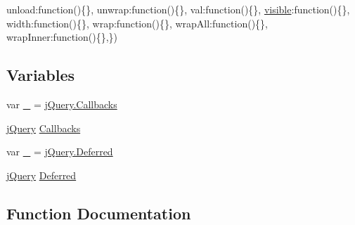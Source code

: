 \begin{DoxyCompactItemize}
\textquotesingle{}unload\textquotesingle{}\+:function()\{\}, \textquotesingle{}unwrap\textquotesingle{}\+:function()\{\}, \textquotesingle{}val\textquotesingle{}\+:function()\{\}, \textquotesingle{}\hyperlink{_scripts_2jquery-1_810_82_8min_8js_a52992524aa1f4d01d5c9f1b9a15c35f5}{visible}\textquotesingle{}\+:function()\{\}, \textquotesingle{}width\textquotesingle{}\+:function()\{\}, \textquotesingle{}wrap\textquotesingle{}\+:function()\{\}, \textquotesingle{}wrap\+All\textquotesingle{}\+:function()\{\}, \textquotesingle{}wrap\+Inner\textquotesingle{}\+:function()\{\},\})
\end{DoxyCompactItemize}
\subsection*{Variables}
\begin{DoxyCompactItemize}
\item 
var \hyperlink{jquery-1_810_82_8intellisense_8js_af58a9af35e2376001e3219aef7e0bda3}{\+\_} = \hyperlink{jquery-1_810_82_8intellisense_8js_add8d59d25831bb9b171fdbee8a18795b}{j\+Query.\+Callbacks}
\item 
\hyperlink{_scripts_2jquery-1_810_82_8js_a41c2e1bff4a6b292938143764e31d789}{j\+Query} \hyperlink{jquery-1_810_82_8intellisense_8js_add8d59d25831bb9b171fdbee8a18795b}{Callbacks}
\item 
var \hyperlink{jquery-1_810_82_8intellisense_8js_a2378dbe13bea17e176a553e3f262f342}{\+\_} = \hyperlink{jquery-1_810_82_8intellisense_8js_ab355ffd82371d88c17da7c1dae9e8829}{j\+Query.\+Deferred}
\item 
\hyperlink{_scripts_2jquery-1_810_82_8js_a41c2e1bff4a6b292938143764e31d789}{j\+Query} \hyperlink{jquery-1_810_82_8intellisense_8js_ab355ffd82371d88c17da7c1dae9e8829}{Deferred}
\end{DoxyCompactItemize}


\subsection{Function Documentation}
